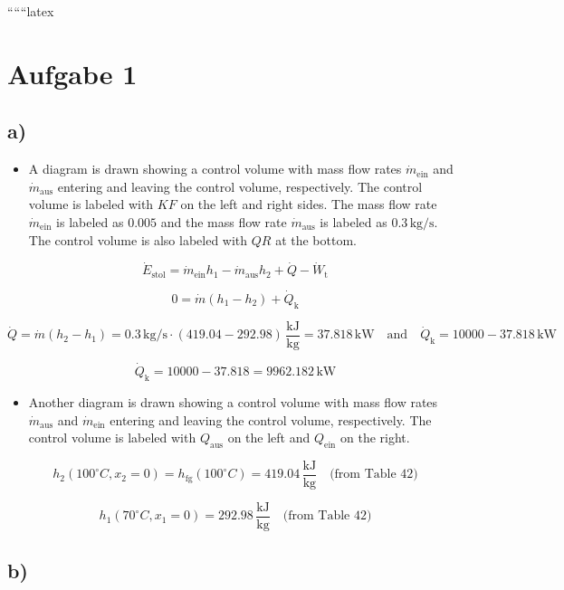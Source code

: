 
``````latex


\section*{Aufgabe 1}

\subsection*{a)}

\begin{itemize}
    \item A diagram is drawn showing a control volume with mass flow rates $\dot{m}_{\text{ein}}$ and $\dot{m}_{\text{aus}}$ entering and leaving the control volume, respectively. The control volume is labeled with $KF$ on the left and right sides. The mass flow rate $\dot{m}_{\text{ein}}$ is labeled as $0.005$ and the mass flow rate $\dot{m}_{\text{aus}}$ is labeled as $0.3 \, \text{kg/s}$. The control volume is also labeled with $QR$ at the bottom.
\end{itemize}

\[
\dot{E}_{\text{stol}} = \dot{m}_{\text{ein}} h_1 - \dot{m}_{\text{aus}} h_2 + \dot{Q} - \dot{W}_{\text{t}}
\]

\[
0 = \dot{m} (h_1 - h_2) + \dot{Q}_{\text{k}}
\]

\[
\dot{Q} = \dot{m} (h_2 - h_1) = 0.3 \, \text{kg/s} \cdot (419.04 - 292.98) \, \frac{\text{kJ}}{\text{kg}} = 37.818 \, \text{kW} \quad \text{and} \quad \dot{Q}_{\text{k}} = 10000 - 37.818 \, \text{kW}
\]

\[
\dot{Q}_{\text{k}} = 10000 - 37.818 = 9962.182 \, \text{kW}
\]

\begin{itemize}
    \item Another diagram is drawn showing a control volume with mass flow rates $\dot{m}_{\text{aus}}$ and $\dot{m}_{\text{ein}}$ entering and leaving the control volume, respectively. The control volume is labeled with $Q_{\text{aus}}$ on the left and $Q_{\text{ein}}$ on the right.
\end{itemize}

\[
h_2 (100^\circ C, x_2 = 0) = h_{\text{fg}} (100^\circ C) = 419.04 \, \frac{\text{kJ}}{\text{kg}} \quad \text{(from Table 42)}
\]

\[
h_1 (70^\circ C, x_1 = 0) = 292.98 \, \frac{\text{kJ}}{\text{kg}} \quad \text{(from Table 42)}
\]

\subsection*{b)}

